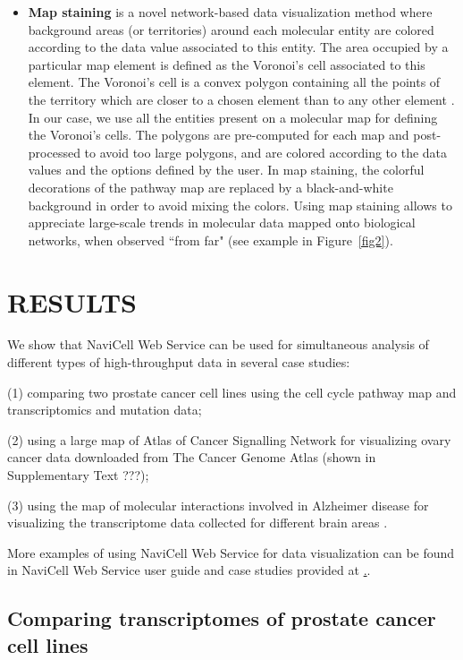 \documentclass[a4,center,fleqn]{NAR}
\begin{document}
\begin{itemize}
\item \textbf{Map staining} is a novel network-based data visualization method where
background areas (or territories) around each molecular entity are colored according to the data
value associated to this entity. The area occupied by a particular map element is defined as the Voronoi's cell
associated to this element. The Voronoi's cell is a convex polygon containing all the points
of the territory which are closer to a chosen element than to any other element
\cite{aurenhammer1991voronoi}. In our case, we use all the entities present on a molecular map
for defining the Voronoi's cells. The polygons are pre-computed for each map and post-processed
to avoid too large polygons, and are colored according to the data values and the options
defined by the user. In map staining, the colorful decorations of the pathway map
are replaced by a black-and-white background in order to avoid mixing the colors.
Using map staining allows to appreciate large-scale trends in molecular data mapped
onto biological networks, when observed ``from far" (see example in Figure~\ref{fig2}).

\end{itemize}



\section{RESULTS}

We show that NaviCell Web Service can be used for simultaneous analysis of different types of high-throughput data
in several case studies:

(1) comparing two prostate cancer cell lines using the cell cycle pathway map and transcriptomics and mutation data;

(2) using a large map of Atlas of Cancer Signalling Network \cite{Kuperstein2015} for visualizing ovary cancer data downloaded from The Cancer Genome Atlas \cite{TCGA2011Ovarian} (shown in Supplementary Text ???);

(3) using the map of molecular interactions involved in Alzheimer disease \cite{Mizuno2012} for visualizing the transcriptome data collected for different brain areas \cite{Hokama2014}.

More examples of using NaviCell Web Service for data visualization can be found in NaviCell Web Service user guide and case studies
provided at \href{http://navicell.curie.fr/pages/nav\_web\_service.html}..


\subsection{Comparing transcriptomes of prostate cancer cell lines}
\end{document}
